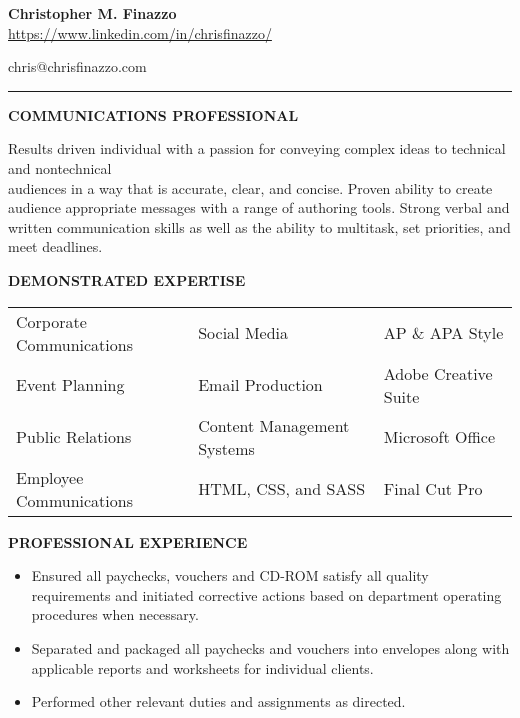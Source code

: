 \documentclass[letterpaper,12pt]{article}
\begin{document}
\begin{center}
\textbf
{\Large{Christopher M. Finazzo}} \\
\href{https://www.linkedin.com/in/chrisfinazzo/}{https://www.linkedin.com/in/chrisfinazzo/}
\end{center}
\hfill \hfill {chris@chrisfinazzo.com}
\vspace*{0.20cm}
\hrule
\vspace*{0.20cm}
\begin{center}
\textbf
{COMMUNICATIONS PROFESSIONAL}
\end{center}
\noindent
\begin{raggedright}
Results driven individual with a passion for conveying complex ideas to technical and nontechnical\\ audiences in a way that is accurate, clear, and concise. Proven ability to create audience appropriate messages with a range of authoring tools. Strong verbal and written communication skills as well as the ability to multitask, set priorities, and meet deadlines.\\
\end{raggedright}
\begin{center}
\textbf{DEMONSTRATED EXPERTISE}\\
\end{center}
\begin{center}
\begin{tabular}{lll}
Corporate Communications & Social Media & AP \& APA Style\\
Event Planning & Email Production & Adobe Creative Suite\\
Public Relations & Content Management Systems & Microsoft Office\\
Employee Communications & HTML, CSS, and SASS & Final Cut Pro\\
\end{tabular}
\end{center}
\begin{center}
\textbf{PROFESSIONAL EXPERIENCE}
\end{center}
%
\begin{itemize}[nosep]
  \item
  Ensured all paychecks, vouchers and CD-ROM satisfy all quality requirements and initiated corrective actions based on department operating procedures when necessary.
\item
  Separated and packaged all paychecks and vouchers into envelopes along with applicable reports and worksheets for individual clients.
\item
  Performed other relevant duties and assignments as directed.
\end{itemize}
\end{document}
